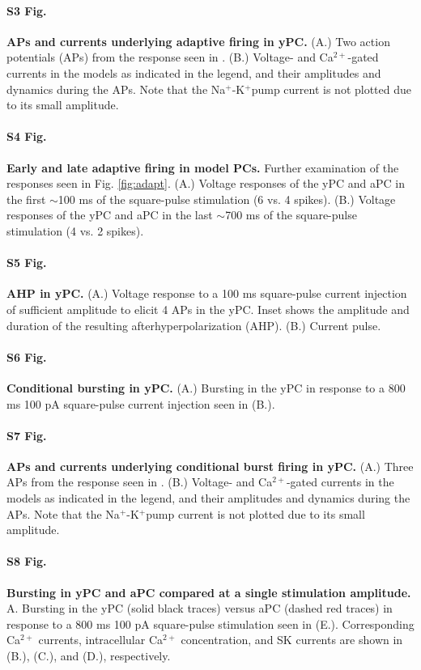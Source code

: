 \documentclass[10pt,letterpaper]{article}
\newcommand{\Ca}{Ca$^{2+}$}
\newcommand{\K}{K$^{+}$}
\newcommand{\Na}{Na$^{+}$}
\begin{document}
\paragraph*{S3 Fig.}
\label{S3_Fig}
{\bf APs and currents underlying adaptive firing in yPC.} (A.) Two action potentials (APs) from the response seen in . (B.) Voltage- and \Ca-gated currents in the models as indicated in the legend, and their amplitudes and dynamics during the APs. Note that the \Na-\K pump current is not plotted due to its small amplitude.

\paragraph*{S4 Fig.}
\label{S4_Fig}
{\bf Early and late adaptive firing in model PCs.} Further examination of the responses seen in Fig. \ref{fig:adapt}. (A.) Voltage responses of the yPC and aPC in the first $\sim$100 ms of the square-pulse stimulation (6 vs. 4 spikes). (B.) Voltage responses of the yPC and aPC in the last $\sim$700 ms of the square-pulse stimulation (4 vs. 2 spikes). 

\paragraph*{S5 Fig.}
\label{S5_Fig}
{\bf AHP in yPC.} (A.) Voltage response to a 100 ms square-pulse current injection of sufficient amplitude to elicit 4 APs in the yPC. Inset shows the amplitude and duration of the resulting afterhyperpolarization (AHP). (B.) Current pulse.

\paragraph*{S6 Fig.}
\label{S6_Fig}
{\bf Conditional bursting in yPC.} (A.) Bursting in the yPC in response to a 800 ms 100 pA square-pulse current injection seen in (B.).

\paragraph*{S7 Fig.}
\label{S7_Fig}
{\bf APs and currents underlying conditional burst firing in yPC.} (A.) Three APs from the response seen in . (B.) Voltage- and \Ca-gated currents in the models as indicated in the legend, and their amplitudes and dynamics during the APs. Note that the \Na-\K pump current is not plotted due to its small amplitude.

\paragraph*{S8 Fig.}
\label{S8_Fig}
{\bf Bursting in yPC and aPC compared at a single stimulation amplitude.} A. Bursting in the yPC (solid black traces) versus aPC (dashed red traces) in response to a 800 ms 100 pA square-pulse stimulation seen in (E.). Corresponding {\Ca} currents, intracellular {\Ca} concentration, and SK currents are shown in (B.), (C.), and (D.), respectively.
\end{document}
